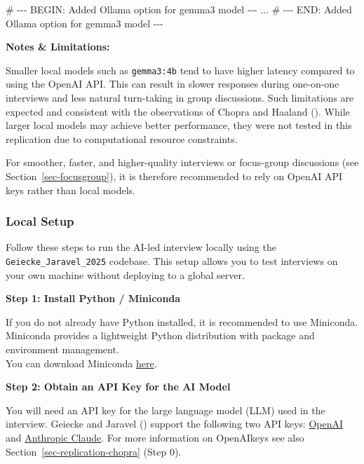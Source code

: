 \documentclass[
  letterpaper,
  DIV=11,
  numbers=noendperiod]{scrartcl}
\newenvironment{Shaded}{\begin{snugshade}}{\end{snugshade}}
\newcommand{\CommentTok}[1]{\textcolor[rgb]{0.37,0.37,0.37}{#1}}
\newcommand{\NormalTok}[1]{\textcolor[rgb]{0.00,0.23,0.31}{#1}}
\newcommand{\RegionMarkerTok}[1]{\textcolor[rgb]{0.00,0.23,0.31}{#1}}
\begin{document}
\begin{Shaded}
\begin{Highlighting}[]
    \CommentTok{\# {-}{-}{-} }\RegionMarkerTok{BEGIN}\CommentTok{: Added Ollama option for gemma3 model {-}{-}{-}}
\NormalTok{    ...}
    \CommentTok{\# {-}{-}{-} }\RegionMarkerTok{END}\CommentTok{: Added Ollama option for gemma3 model {-}{-}{-}}
\end{Highlighting}
\end{Shaded}

\textbf{Notes \& Limitations:}

Smaller local models such as \texttt{gemma3:4b} tend to have higher
latency compared to using the OpenAI API. This can result in slower
responses during one-on-one interviews and less natural turn-taking in
group discussions. Such limitations are expected and consistent with the
observations of Chopra and Haaland
(). While larger local models
may achieve better performance, they were not tested in this replication
due to computational resource constraints.

For smoother, faster, and higher-quality interviews or focus-group
discussions (see Section~\ref{sec-focusgroup}), it is therefore
recommended to rely on OpenAI API keys rather than local models.

\subsubsection{Local Setup}\label{sec-replication-geiecke-local}

Follow these steps to run the AI-led interview locally using the
\texttt{Geiecke\_Jaravel\_2025} codebase. This setup allows you to test
interviews on your own machine without deploying to a global server.

\textbf{Step 1: Install Python / Miniconda}

If you do not already have Python installed, it is recommended to use
Miniconda. Miniconda provides a lightweight Python distribution with
package and environment management.\\
You can download Miniconda
\href{https://docs.anaconda.com/miniconda/miniconda-install/}{here}.

\textbf{Step 2: Obtain an API Key for the AI Model}

You will need an API key for the large language model (LLM) used in the
interview. Geiecke and Jaravel
() support the following two
API keys: \href{https://platform.openai.com/}{OpenAI} and
\href{https://www.anthropic.com/api}{Anthropic Claude}. For more
information on OpenAIkeys see also Section~\ref{sec-replication-chopra}
(Step 0).
\end{document}
